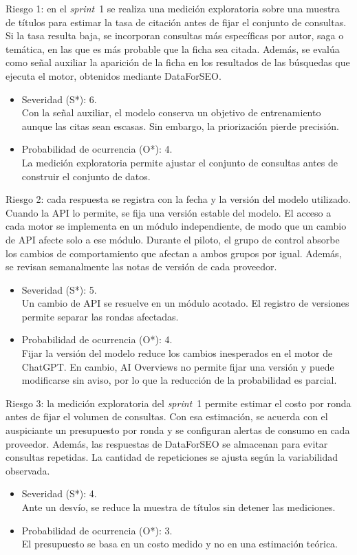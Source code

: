 \documentclass[
11pt, %
codirector, %
]{charter}
\begin{document}
Riesgo 1: en el \textit{sprint}~1 se realiza una medición exploratoria sobre una muestra de títulos para estimar la tasa de citación antes de fijar el conjunto de consultas. Si la tasa resulta baja, se incorporan consultas más específicas por autor, saga o temática, en las que es más probable que la ficha sea citada. Además, se evalúa como señal auxiliar la aparición de la ficha en los resultados de las búsquedas que ejecuta el motor, obtenidos mediante DataForSEO.
\begin{itemize}
	\item Severidad (S*): 6.\\
	Con la señal auxiliar, el modelo conserva un objetivo de entrenamiento aunque las citas sean escasas. Sin embargo, la priorización pierde precisión.
	\item Probabilidad de ocurrencia (O*): 4.\\
	La medición exploratoria permite ajustar el conjunto de consultas antes de construir el conjunto de datos.
\end{itemize}

Riesgo 2: cada respuesta se registra con la fecha y la versión del modelo utilizado. Cuando la API lo permite, se fija una versión estable del modelo. El acceso a cada motor se implementa en un módulo independiente, de modo que un cambio de API afecte solo a ese módulo. Durante el piloto, el grupo de control absorbe los cambios de comportamiento que afectan a ambos grupos por igual. Además, se revisan semanalmente las notas de versión de cada proveedor.
\begin{itemize}
	\item Severidad (S*): 5.\\
	Un cambio de API se resuelve en un módulo acotado. El registro de versiones permite separar las rondas afectadas.
	\item Probabilidad de ocurrencia (O*): 4.\\
	Fijar la versión del modelo reduce los cambios inesperados en el motor de ChatGPT. En cambio, AI Overviews no permite fijar una versión y puede modificarse sin aviso, por lo que la reducción de la probabilidad es parcial.
\end{itemize}

Riesgo 3: la medición exploratoria del \textit{sprint}~1 permite estimar el costo por ronda antes de fijar el volumen de consultas. Con esa estimación, se acuerda con el auspiciante un presupuesto por ronda y se configuran alertas de consumo en cada proveedor. Además, las respuestas de DataForSEO se almacenan para evitar consultas repetidas. La cantidad de repeticiones se ajusta según la variabilidad observada.
\begin{itemize}
	\item Severidad (S*): 4.\\
	Ante un desvío, se reduce la muestra de títulos sin detener las mediciones.
	\item Probabilidad de ocurrencia (O*): 3.\\
	El presupuesto se basa en un costo medido y no en una estimación teórica.
\end{itemize}
\end{document}
